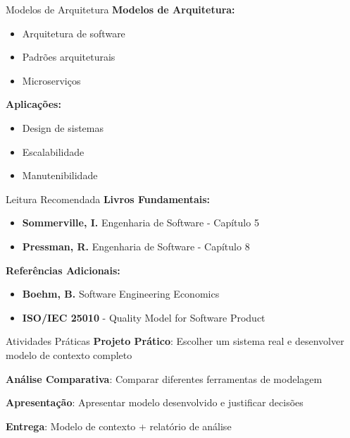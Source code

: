 \documentclass[aspectratio=169]{beamer}
\begin{document}
\begin{frame}{Modelos de Arquitetura}
\textbf{Modelos de Arquitetura:}
\begin{itemize}
\item Arquitetura de software
\item Padrões arquiteturais
\item Microserviços
\end{itemize}

\vspace{0.5cm}
\textbf{Aplicações:}
\begin{itemize}
\item Design de sistemas
\item Escalabilidade
\item Manutenibilidade
\end{itemize}
\end{frame}

\begin{frame}{Leitura Recomendada}
\textbf{Livros Fundamentais:}
\begin{itemize}
\item \textbf{Sommerville, I.} Engenharia de Software - Capítulo 5
\item \textbf{Pressman, R.} Engenharia de Software - Capítulo 8
\end{itemize}

\vspace{0.5cm}
\textbf{Referências Adicionais:}
\begin{itemize}
\item \textbf{Boehm, B.} Software Engineering Economics
\item \textbf{ISO/IEC 25010} - Quality Model for Software Product
\end{itemize}
\end{frame}

\begin{frame}{Atividades Práticas}
\textbf{Projeto Prático}: Escolher um sistema real e desenvolver modelo de contexto completo

\vspace{0.5cm}
\textbf{Análise Comparativa}: Comparar diferentes ferramentas de modelagem

\vspace{0.5cm}
\textbf{Apresentação}: Apresentar modelo desenvolvido e justificar decisões

\vspace{0.5cm}
\textbf{Entrega}: Modelo de contexto + relatório de análise
\end{frame}
\end{document}
